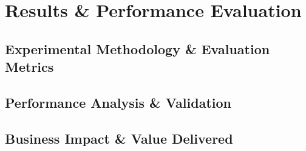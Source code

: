 \chapter{Results \& Performance Evaluation}
\label{chap:results_evaluation}

\section{Experimental Methodology \& Evaluation Metrics}

\section{Performance Analysis \& Validation}

\section{Business Impact \& Value Delivered}
